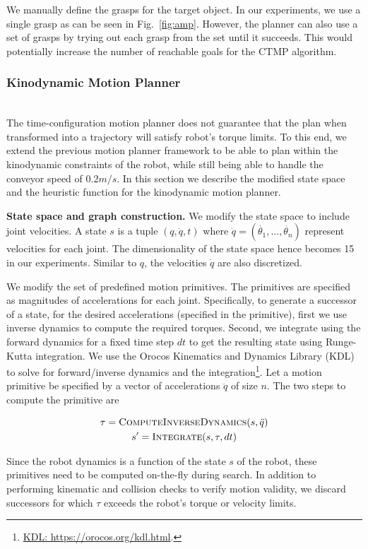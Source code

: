 \documentclass[a4paper]{report}
\begin{document}
We manually define the grasps for the target object. In our experiments, we use a single grasp as can be seen in Fig.~\ref{fig:amp}. However, the planner can also use a set of grasps by trying out each grasp from the set until it succeeds. This would potentially increase the number of reachable goals for the CTMP algorithm.
\subsubsection{Kinodynamic Motion Planner}
\hfill\\
The time-configuration motion planner does not guarantee that the plan when transformed into a trajectory will satisfy robot's torque limits. To this end, we extend the previous motion planner framework to be able to plan within the kinodynamic constraints of the robot, while still being able to handle the conveyor speed of 0.2$m/s$. In this section we describe the modified state space and the heuristic function for the kinodynamic motion planner.

\textbf{State space and graph construction.}
We modify the state space to include joint velocities. A state $s$ is a tuple $(q,\dot{q},t)$ where $\dot{q} = (\dot{\theta_1},..., \dot{\theta_n})$ represent velocities for each joint. The dimensionality of the state space hence becomes 15 in our experiments. Similar to $q$, the velocities $\dot{q}$ are also discretized.

We modify the set of predefined motion primitives. The primitives are specified as magnitudes of accelerations for each joint. Specifically, to generate a successor of a state, for the desired accelerations (specified in the primitive), first we use inverse dynamics to compute the required torques. Second, we integrate using the forward dynamics for a fixed time step $dt$ to get the resulting state using Runge-Kutta integration. We use the Orocos Kinematics and Dynamics Library (KDL) to solve for forward/inverse dynamics and the integration\footnote{\url{KDL: https://orocos.org/kdl.html}.}.
Let a motion primitive be specified by a vector of accelerations $\ddot{q}$ of size $n$. The two steps to compute the primitive are

%
\begin{gather*}
\tau = \textsc{ComputeInverseDynamics}(s,\ddot{q}) \\
s' = \textsc{Integrate}(s, \tau, dt)
\end{gather*}
%

Since the robot dynamics is a function of the state $s$ of the robot, these primitives need to be computed on-the-fly during search. In addition to performing kinematic and collision checks to verify motion validity, we discard successors for which $\tau$ exceeds the robot's torque or velocity limits.
\end{document}
